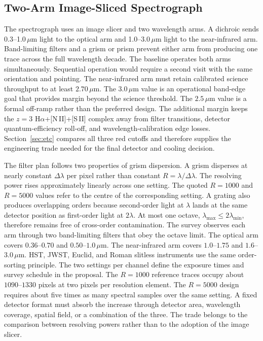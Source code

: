 \subsection{Two-Arm Image-Sliced Spectrograph}

The spectrograph uses an image slicer and two wavelength arms. A dichroic sends 0.3--1.0\,$\mu$m light to the optical arm and 1.0--3.0\,$\mu$m light to the near-infrared arm. Band-limiting filters and a grism or prism prevent either arm from producing one trace across the full wavelength decade. The baseline operates both arms simultaneously. Sequential operation would require a second visit with the same orientation and pointing. The near-infrared arm must retain calibrated science throughput to at least $2.70\,\mu$m. The $3.0\,\mu$m value is an operational band-edge goal that provides margin beyond the science threshold. The $2.5\,\mu$m value is a formal off-ramp rather than the preferred design. The additional margin keeps the $z=3$ H$\alpha$+[N\,II]+[S\,II] complex away from filter transitions, detector quantum-efficiency roll-off, and wavelength-calibration edge losses. Section~\ref{sec:etc} compares all three red cutoffs and therefore supplies the engineering trade needed for the final detector and cooling decision.

The filter plan follows two properties of grism dispersion. A grism disperses at nearly constant $\Delta\lambda$ per pixel rather than constant $R=\lambda/\Delta\lambda$. The resolving power rises approximately linearly across one setting. The quoted $R=1000$ and $R=5000$ values refer to the centre of the corresponding setting. A grating also produces overlapping orders because second-order light at $\lambda$ lands at the same detector position as first-order light at $2\lambda$. At most one octave, $\lambda_{\max}\leq2\lambda_{\min}$, therefore remains free of cross-order contamination. The survey observes each arm through two band-limiting filters that obey the octave limit. The optical arm covers $0.36$--$0.70$ and $0.50$--$1.0\,\mu$m. The near-infrared arm covers $1.0$--$1.75$ and $1.6$--$3.0\,\mu$m. HST, JWST, Euclid, and Roman slitless instruments use the same order-sorting principle. The two settings per channel define the exposure times and survey schedule in the proposal. The $R=1000$ reference traces occupy about $1090$--$1330$ pixels at two pixels per resolution element. The $R=5000$ design requires about five times as many spectral samples over the same setting. A fixed detector format must absorb the increase through detector area, wavelength coverage, spatial field, or a combination of the three. The trade belongs to the comparison between resolving powers rather than to the adoption of the image slicer.

